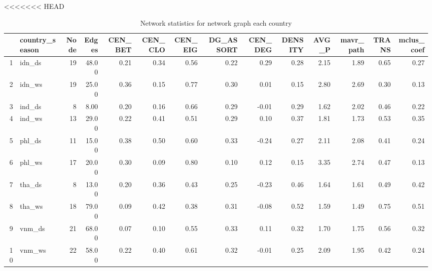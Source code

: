 <<<<<<< HEAD
\begin{landscape}
\begin{table}
\small
\centering
\begin{tabular}{rlrrrrrrrrrrrr}
  \hline
 & country\_season & Node & Edges & CEN\_BET & CEN\_CLO & CEN\_EIG & DG\_ASSORT & CEN\_DEG & DENSITY & AVG\_P & mavr\_path & TRANS & mclus\_coef \\ 
  \hline
1 & idn\_ds &  19 & 48.00 & 0.21 & 0.34 & 0.56 & 0.22 & 0.29 & 0.28 & 2.15 & 1.89 & 0.65 & 0.27 \\ 
  2 & idn\_ws &  19 & 25.00 & 0.36 & 0.15 & 0.77 & 0.30 & 0.01 & 0.15 & 2.80 & 2.69 & 0.30 & 0.13 \\ 
  3 & ind\_ds &   8 & 8.00 & 0.20 & 0.16 & 0.66 & 0.29 & -0.01 & 0.29 & 1.62 & 2.02 & 0.46 & 0.22 \\ 
  4 & ind\_ws &  13 & 29.00 & 0.22 & 0.41 & 0.51 & 0.29 & 0.10 & 0.37 & 1.81 & 1.73 & 0.53 & 0.35 \\ 
  5 & phl\_ds &  11 & 15.00 & 0.38 & 0.50 & 0.60 & 0.33 & -0.24 & 0.27 & 2.11 & 2.08 & 0.41 & 0.24 \\ 
  6 & phl\_ws &  17 & 20.00 & 0.30 & 0.09 & 0.80 & 0.10 & 0.12 & 0.15 & 3.35 & 2.74 & 0.47 & 0.13 \\ 
  7 & tha\_ds &   8 & 13.00 & 0.20 & 0.36 & 0.43 & 0.25 & -0.23 & 0.46 & 1.64 & 1.61 & 0.49 & 0.42 \\ 
  8 & tha\_ws &  18 & 79.00 & 0.09 & 0.42 & 0.38 & 0.31 & -0.08 & 0.52 & 1.59 & 1.49 & 0.75 & 0.51 \\ 
  9 & vnm\_ds &  21 & 68.00 & 0.07 & 0.10 & 0.55 & 0.33 & 0.11 & 0.32 & 1.70 & 1.75 & 0.56 & 0.32 \\ 
  10 & vnm\_ws &  22 & 58.00 & 0.22 & 0.40 & 0.61 & 0.32 & -0.01 & 0.25 & 2.09 & 1.95 & 0.42 & 0.24 \\ 
   \hline
\end{tabular}
   \caption{Network statistics for network graph each country}
\label{table:Network_stat}
\end{table}
\end{landscape}
